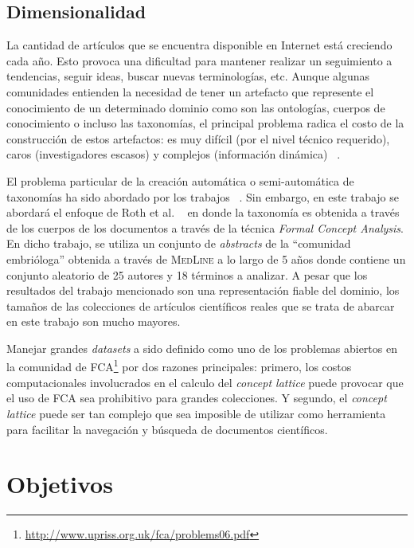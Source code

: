 \documentclass[12pt,oneside,letterpaper]{book}
\newcommand{\eng}[1]{\textit{#1}\xspace}			%
\newcommand{\abr}[1]{\textsc{#1}\xspace}           %
\theoremstyle{definition}
\begin{document}
\section{Dimensionalidad}
\label{sec:dimensionalidad}
La cantidad de artículos que se encuentra disponible en Internet está creciendo cada año. Esto provoca una dificultad para mantener realizar un seguimiento a tendencias, seguir ideas, buscar nuevas terminologías, etc. Aunque algunas comunidades entienden la necesidad de tener un artefacto que represente el conocimiento de un determinado dominio como son las ontologías, cuerpos de conocimiento o incluso las taxonomías, el principal problema radica el costo de la construcción de estos artefactos: es muy difícil (por el nivel técnico requerido), caros (investigadores escasos) y  complejos (información dinámica) ~\cite{codocedo2011cheating}.

El problema particular de la creación automática o semi-automática de taxonomías ha sido abordado por los trabajos ~\cite{cimiano2005learning,dakka2005automatic,kominek1997accessing,yeh2008ontology}. Sin embargo, en este trabajo se abordará el enfoque de Roth et al. ~\cite{roth2008towards} en donde la taxonomía es obtenida a través de los cuerpos de los documentos a través de la técnica \eng{Formal Concept Analysis}. En dicho trabajo, se utiliza un conjunto de \eng{abstracts} de la ``comunidad embrióloga'' obtenida a través de \abr{MedLine} a lo largo de 5 años donde contiene un conjunto aleatorio de 25 autores y 18 términos a analizar. A pesar que los resultados del trabajo mencionado son una representación fiable del dominio, los tamaños de las colecciones de artículos científicos reales que se trata de abarcar en este trabajo son mucho mayores.

Manejar grandes \eng{datasets} a sido definido como uno de los problemas abiertos en la comunidad de \abr{FCA}\footnote{\url{http://www.upriss.org.uk/fca/problems06.pdf}} por dos razones principales: primero, los costos computacionales involucrados en el calculo del \eng{concept lattice} puede provocar que el uso de \abr{FCA} sea prohibitivo para grandes colecciones. Y segundo, el \eng{concept lattice} puede ser tan complejo que sea imposible de utilizar como herramienta para facilitar la navegación y búsqueda de documentos científicos. 


\chapter{Objetivos}
\label{chap:goals}
\end{document}
